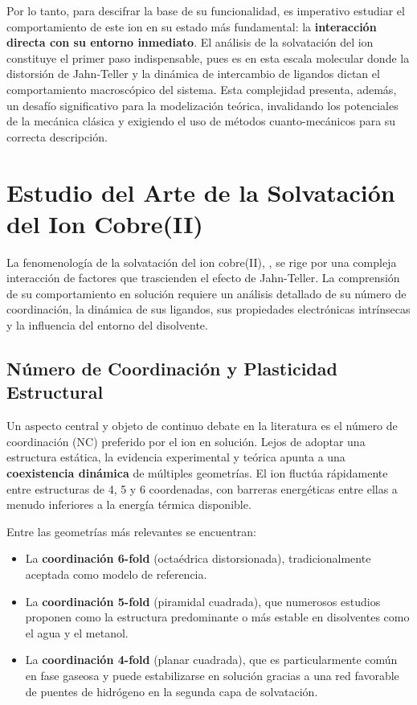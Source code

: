 Por lo tanto, para descifrar la base de su funcionalidad, es imperativo estudiar el comportamiento de este ion en su estado más fundamental: la \textbf{interacción directa con su entorno inmediato}. El análisis de la solvatación del ion  constituye el primer paso indispensable, pues es en esta escala molecular donde la distorsión de Jahn-Teller y la dinámica de intercambio de ligandos dictan el comportamiento macroscópico del sistema. Esta complejidad presenta, además, un desafío significativo para la modelización teórica, invalidando los potenciales de la mecánica clásica y exigiendo el uso de métodos cuanto-mecánicos para su correcta descripción.


\section{Estudio del Arte de la Solvatación del Ion Cobre(II)}

La fenomenología de la solvatación del ion cobre(II), , se rige por una compleja interacción de factores que trascienden el efecto de Jahn-Teller. La comprensión de su comportamiento en solución requiere un análisis detallado de su número de coordinación, la dinámica de sus ligandos, sus propiedades electrónicas intrínsecas y la influencia del entorno del disolvente.

\subsection{Número de Coordinación y Plasticidad Estructural}

Un aspecto central y objeto de continuo debate en la literatura es el número de coordinación (NC) preferido por el ion  en solución. Lejos de adoptar una estructura estática, la evidencia experimental y teórica apunta a una \textbf{coexistencia dinámica} de múltiples geometrías. El ion fluctúa rápidamente entre estructuras de 4, 5 y 6 coordenadas, con barreras energéticas entre ellas a menudo inferiores a la energía térmica disponible.

Entre las geometrías más relevantes se encuentran:
\begin{itemize}
    \item La \textbf{coordinación 6-fold} (octaédrica distorsionada), tradicionalmente aceptada como modelo de referencia.
    \item La \textbf{coordinación 5-fold} (piramidal cuadrada), que numerosos estudios proponen como la estructura predominante o más estable en disolventes como el agua y el metanol.
    \item La \textbf{coordinación 4-fold} (planar cuadrada), que es particularmente común en fase gaseosa y puede estabilizarse en solución gracias a una red favorable de puentes de hidrógeno en la segunda capa de solvatación.
\end{itemize}

